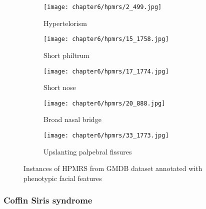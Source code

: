 \documentclass[../report.tex]{subfiles}
\begin{document}
	 \begin{figure}[H]\label{fig_hpmrs}
	 	\centering
	 	\begin{subfigure}[t]{0.17\textwidth}
	 		\centering
	 		\texttt{[image: chapter6/hpmrs/2\_499.jpg]}
	 		\caption{Hypertelorism}
	 	\end{subfigure}
	 	\begin{subfigure}[t]{0.17\textwidth}
	 		\centering
	 		\texttt{[image: chapter6/hpmrs/15\_1758.jpg]}
	 		\caption{Short philtrum}
	 	\end{subfigure}	
	 	\begin{subfigure}[t]{0.17\textwidth}
	 		\centering
	 		\texttt{[image: chapter6/hpmrs/17\_1774.jpg]}
			\caption{Short nose}
	 	\end{subfigure}	
	 	\begin{subfigure}[t]{0.17\textwidth}
	 		\centering
	 		\texttt{[image: chapter6/hpmrs/20\_888.jpg]}
	 		\caption{Broad nasal bridge}
	 	\end{subfigure}	
	 	\begin{subfigure}[t]{0.17\textwidth}
	 		\centering
	 		\texttt{[image: chapter6/hpmrs/33\_1773.jpg]}
	 		\caption{Upslanting palpebral fissures}
	 	\end{subfigure}	
	 	\caption[Instances of HPMRS from GMDB dataset]{Instances of HPMRS from GMDB dataset annotated with phenotypic facial features}
	 \end{figure}
	 
	 	\subsubsection{Coffin Siris syndrome}
	 
\end{document}
